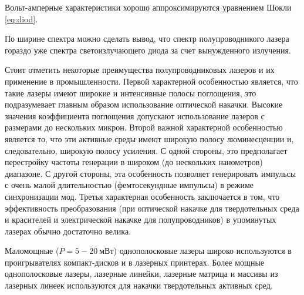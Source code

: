 \documentclass[a4paper, 12pt]{article}
\begin{document}
Вольт-амперные характеристики хорошо аппроксимируются уравнением Шокли
\eqref{eq:diod}.

По ширине спектра можно сделать вывод, что спектр полупроводникого
лазера гораздо уже спектра светоизлучающего диода за счет вынужденного
излучения.

Стоит отметить некоторые преимущества полупроводниковых лазеров и их
применение в промышленности. Первой характерной особенностью является,
что такие лазеры имеют широкие и интенсивные полосы поглощения, это
подразумевает главным образом использование оптической накачки.
Высокие значения коэффициента поглощения допускают использование
лазеров с размерами до нескольких микрон. Второй важной характерной
особенностью является то, что эти активные среды имеют широкую полосу
люминесценции и, следовательно, широкую полосу усиления. С одной
стороны, это предполагает перестройку частоты генерации в широком (до
нескольких нанометров) диапазоне. С другой стороны, эта особенность
позволяет генерировать импульсы с очень малой длительностью
(фемтосекундные импульсы) в режиме синхронизации мод. Третья
характерная особенность заключается в том, что эффективность
преобразования (при оптической накачке для твердотельных среда и
красителей и электрической накачке для полупроводников) в упомянутых
лазерах обычно достаточно велика. 

Маломощные ($P=5-20\: мВт$) однополосковые лазеры широко используются
в проигрывателях компакт-дисков и в лазерных принтерах. Более мощные
однополосковые лазеры, лазерные линейки, лазерные матрица и массивы из
лазерных линеек используются для накачки твердотельных активных сред.
\end{document}
